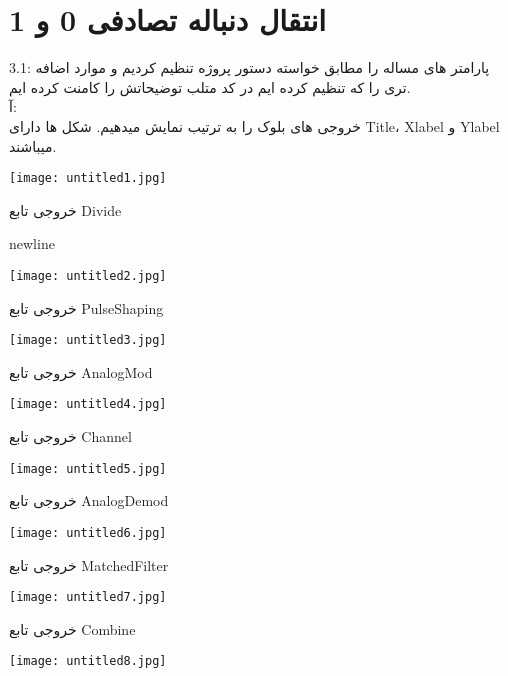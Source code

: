 \section{انتقال دنباله تصادفی 0 و 1}
\large
3.1: 
پارامتر های مساله را مطابق خواسته دستور پروژه تنظیم کردیم و موارد اضافه تری را که تنظیم کرده ایم در کد متلب توضیحاتش را کامنت کرده ایم.
\\[1cm]
آ:
\\
خروجی های بلوک را به ترتیب نمایش میدهیم. شکل ها دارای Title، Xlabel و Ylabel میباشند.
\\
\begin{center}
    \texttt{[image: untitled1.jpg]}
\end{center}
\centering
خروجی تابع Divide


newline
\begin{center}
    \texttt{[image: untitled2.jpg]}
\end{center}

\centering
خروجی تابع PulseShaping
 
\begin{center}
    \texttt{[image: untitled3.jpg]}
\end{center}

\centering
خروجی تابع AnalogMod
 

\begin{center}
    \texttt{[image: untitled4.jpg]}
\end{center}

\centering
خروجی تابع Channel
 

\begin{center}
    \texttt{[image: untitled5.jpg]}
\end{center}
\centering
خروجی تابع AnalogDemod
 

\begin{center}
    \texttt{[image: untitled6.jpg]}
\end{center}

\centering
خروجی تابع MatchedFilter
 

\begin{center}
    \texttt{[image: untitled7.jpg]}
\end{center}

\centering
خروجی تابع Combine
 

\begin{center}
    \texttt{[image: untitled8.jpg]}
\end{center}

